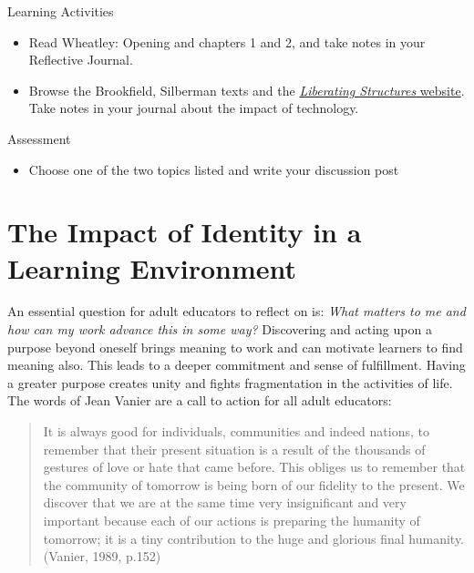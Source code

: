 \documentclass[
]{book}
\providecommand{\tightlist}{%
  \setlength{\itemsep}{0pt}\setlength{\parskip}{0pt}}
\begin{document}
\begin{reflect}
{Learning Activities}

\begin{itemize}
\tightlist
\item
  Read Wheatley: Opening and chapters 1 and 2, and take notes in your
  Reflective Journal.\\
\item
  Browse the Brookfield, Silberman texts and the
  \href{http://www.liberatingstructures.com/ls-menu/}{\emph{Liberating
  Structures} website}. Take notes in your journal about the impact of
  technology.
\end{itemize}
\end{reflect}

\begin{assessment}
{Assessment}

\begin{itemize}
\tightlist
\item
  Choose one of the two topics listed and write your discussion post
\end{itemize}
\end{assessment}

\hypertarget{the-impact-of-identity-in-a-learning-environment}{%
\section{The Impact of Identity in a Learning Environment}\label{the-impact-of-identity-in-a-learning-environment}}

An essential question for adult educators to reflect on is: \emph{What matters to me and how can my work advance this in some way?} Discovering and acting upon a purpose beyond oneself brings meaning to work and can motivate learners to find meaning also. This leads to a deeper commitment and sense of fulfillment. Having a greater purpose creates unity and fights fragmentation in the activities of life. The words of Jean Vanier are a call to action for all adult educators:

\begin{quote}
It is always good for individuals, communities and indeed nations, to remember that their present situation is a result of the thousands of gestures of love or hate that came before. This obliges us to remember that the community of tomorrow is being born of our fidelity to the present. We discover that we are at the same time very insignificant and very important because each of our actions is preparing the humanity of tomorrow; it is a tiny contribution to the huge and glorious final humanity. (Vanier, 1989, p.152)
\end{quote}
\end{document}
